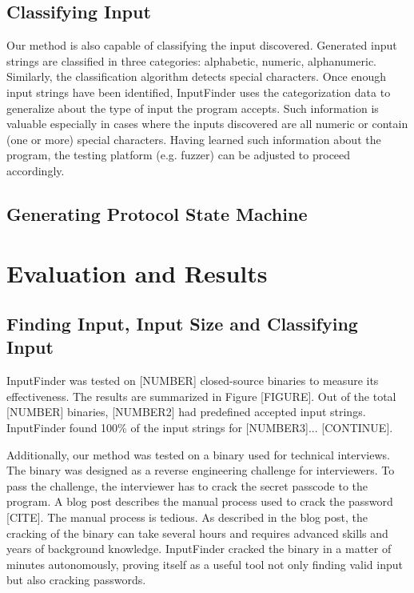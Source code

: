 \documentclass{acm_proc_article-sp}
\def \tool {InputFinder}
\begin{document}
\subsection{Classifying Input}

Our method is also capable of classifying the input discovered.
Generated input strings are classified in three categories: alphabetic, numeric, alphanumeric.
Similarly, the classification algorithm detects special characters.
Once enough input strings have been identified, \tool{} uses the categorization data to generalize about the type of input the program accepts.
Such information is valuable especially in cases where the inputs discovered are all numeric or contain (one or more) special characters.
Having learned such information about the program, the testing platform (e.g. fuzzer) can be adjusted to proceed accordingly.

\subsection{Generating Protocol State Machine}


\section{Evaluation and Results}

\subsection{Finding Input, Input Size and Classifying Input}
\tool{} was tested on [NUMBER] closed-source binaries to measure its effectiveness.
The results are summarized in Figure [FIGURE].
Out of the total [NUMBER] binaries, [NUMBER2] had predefined accepted input strings.
\tool{} found 100\% of the input strings for [NUMBER3]...
[CONTINUE].

Additionally, our method was tested on a binary used for technical interviews.
The binary was designed as a reverse engineering challenge for interviewers.
To pass the challenge, the interviewer has to crack the secret passcode to the program.
A blog post describes the manual process used to crack the password [CITE].
The manual process is tedious.
As described in the blog post, the cracking of the binary can take several hours and requires advanced skills and years of background knowledge.
\tool{} cracked the binary in a matter of minutes autonomously, proving itself as a useful tool not only finding valid input but also cracking passwords.
\end{document}
